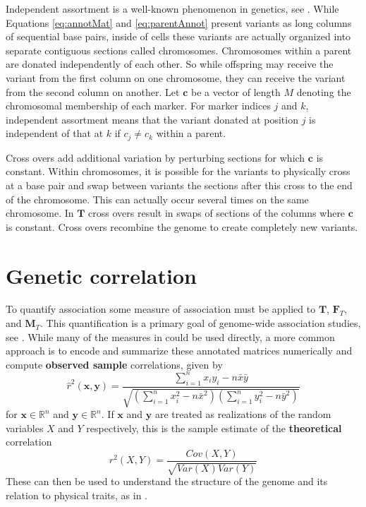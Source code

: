 \documentclass{article}
\newcommand{\ve}[1]{\mathbf{#1}}           %
\newcommand{\m}[1]{\mathbf{#1}}               %
\newcommand{\obscorr}{\widehat{r}^2}
\newcommand{\corr}{r^2}
\newcommand{\field}[1]{\mathbb{#1}}
\newcommand{\Reals}{\field{R}}
\begin{document}
Independent assortment is a well-known phenomenon in genetics, see \cite{siegmundyakir2007}. While Equations \ref{eq:annotMat} and \ref{eq:parentAnnot} present variants as long columns of sequential base pairs, inside of cells these variants are actually organized into separate contiguous sections called chromosomes. Chromosomes within a parent are donated independently of each other. So while offspring may receive the variant from the first column on one chromosome, they can receive the variant from the second column on another. Let $\ve{c}$ be a vector of length $M$ denoting the chromosomal membership of each marker. For marker indices $j$ and $k$, independent assortment means that the variant donated at position $j$ is independent of that at $k$ if $c_j \neq c_k$ within a parent.

Cross overs add additional variation by perturbing sections for which $\ve{c}$ is constant. Within chromosomes, it is possible for the variants to physically cross at a base pair and swap between variants the sections after this cross to the end of the chromosome. This can actually occur several times on the same chromosome. In $\m{T}$ cross overs result in swaps of sections of the columns where $\ve{c}$ is constant. Cross overs recombine the genome to create completely new variants.

\section{Genetic correlation} \label{sec:corr}

To quantify association some measure of association must be applied to $\m{T}$, $\m{F}_T$, and $\m{M}_T$. This quantification is a primary goal of genome-wide association studies, see \cite{uffelmannetal2021gwas, tametal2019benefits, wangetal2005gwas}. While many of the measures in \cite{goodmankruskal1979measures} could be used directly, a more common approach is to encode and summarize these annotated matrices numerically and compute \textbf{observed sample} correlations, given by
\begin{equation} \label{eq:sampleCorr}
  \obscorr(\ve{x}, \ve{y}) = \frac{\sum_{i = 1}^n x_i y_i - n \bar{x} \bar{y}}{\sqrt{\left (\sum_{i = 1}^n x_i^2 - n \bar{x}^2 \right ) \left (\sum_{i = 1}^n y_i^2 - n \bar{y}^2 \right )}}
\end{equation}
for $\ve{x} \in \Reals^n$ and $\ve{y} \in \Reals^n$. If $\ve{x}$ and $\ve{y}$ are treated as realizations of the random variables $X$ and $Y$ respectively, this is the sample estimate of the \textbf{theoretical} correlation
\begin{equation} \label{eq:theorCorr}
 \corr(X, Y) = \frac{Cov(X, Y)}{\sqrt{Var(X) Var(Y)}}
\end{equation}
These can then be used to understand the structure of the genome and its relation to physical traits, as in \cite{poolr, LiJi2005, nyholt2004, cheverudetal2001}.
\end{document}
